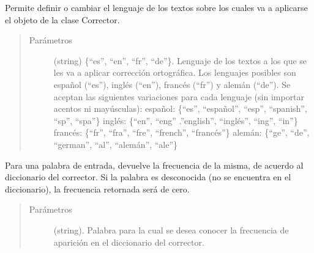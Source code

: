 \documentclass[letterpaper,10pt,openany,spanish]{sphinxmanual}
\begin{document}
\begin{fulllineitems}
\begin{fulllineitems}
\label{\detokenize{funciones/correccion:correccion.Corrector.establecer_lenguaje}}
Permite definir o cambiar el lenguaje de los textos sobre los cuales         va a aplicarse el objeto de la clase Corrector.
\begin{quote}\begin{description}
\item[{Parámetros}] \leavevmode
{} \textendash{} (string) \{“es”, “en”, “fr”, “de”\}. Lenguaje de los             textos a los que se les va a aplicar corrección ortográfica. Los lenguajes posibles son             español (“es”), inglés (“en”), francés (“fr”) y alemán (“de”). Se aceptan las             siguientes variaciones para cada lenguaje (sin importar acentos ni mayúsculas):                      español: \{“es”, “español”, “esp”, “spanish”, “sp”, “spa”\} 
 inglés: \{“en”, “eng” .”english”, “inglés”, “ing”, “in”\} 
 francés: \{“fr”, “fra”, “fre”, “french”, “francés”\} 
 alemán: \{“ge”, “de”, “german”, “al”, “alemán”, “ale”\}   

\end{description}\end{quote}

\end{fulllineitems}


\begin{fulllineitems}
\label{\detokenize{funciones/correccion:correccion.Corrector.frecuencia_palabra}}
Para una palabra de entrada, devuelve la frecuencia de la misma, de acuerdo al             diccionario del corrector. Si la palabra es desconocida (no se encuentra en             el diccionario), la frecuencia retornada será de cero.
\begin{quote}\begin{description}
\item[{Parámetros}] \leavevmode
{} \textendash{} (string). Palabra para la cual se desea conocer la frecuencia de             aparición en el diccionario del corrector.


\end{description}
\end{quote}
\end{fulllineitems}
\end{fulllineitems}
\end{document}
